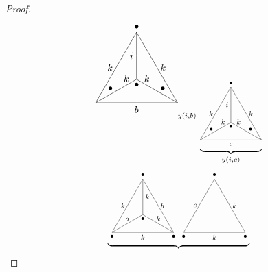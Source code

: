 \documentclass{amsart}
\begin{document}
\begin{proof}
\begin{equation}
{{{{\begin{tikzpicture}[scale=1.5]
\draw (0,0) 	-- (1,0) 		node [below] 	{$b$}; \draw (1,0) 		-- (2,0);
\draw (2,0) 	-- (1.5,.866) 	node [right] 	{$k$}; \draw (1.5,.866) 	-- (1,1.732);
\draw (1,1.732)	node [above] {$\bullet$} 	-- (.5,.866) 	node [left] 	{$k$}; \draw (.5,.866) 	-- (0,0);
\draw (0,0) 	-- (.75,.433) 	node [above] 	{$k$}; \draw (.75,.433) -- (1,0.577);
\draw (1,0.577) node [below] {$\bullet$} -- (1,1.1545) 	node [left]	{$i$}; \draw (1,1.1545) 	-- (1,1.732);
\draw (1,0.577) -- (1.25,.433) 	node [above] 	{$k$}; \draw (1.25,.433) -- (2,0);
\node at (.36,.35) {$\bullet$};
\node at (2-.36,.35) {$\bullet$};
\end{tikzpicture}}}}}_{y(i,b)}\,\underbrace{\vcenter{\hbox{\scalebox{.75}{\begin{tikzpicture}[scale=1.5]
\draw (0,0) -- (1,0) 		node [below] 	{$c$}; \draw (1,0) 		-- (2,0);
\draw (2,0) -- (1.5,.866) 	node [right] 	{$k$}; \draw (1.5,.866) 	-- (1,1.732);
\draw (1,1.732)	node [above] {$\bullet$} 	-- (.5,.866) 	node [left] 	{$k$}; \draw (.5,.866) 	-- (0,0);
\draw (0,0) 	-- (.75,.433) 	node [above] 	{$k$}; \draw (.75,.433) -- (1,0.577);
\draw (1,0.577) node [below] {$\bullet$} -- (1,1.1545) 	node [left]	{$i$}; \draw (1,1.1545) 	-- (1,1.732);
\draw (1,0.577) -- (1.25,.433) 	node [above] 	{$k$}; \draw (1.25,.433) -- (2,0);
\node at (.36,.35) {$\bullet$};
\node at (2-.36,.35) {$\bullet$};
\end{tikzpicture}}}}}_{y(i,c)}
\end{equation}
\begin{equation}\label{equ:II}
\underbrace{\vcenter{\hbox{\scalebox{.75}{\begin{tikzpicture}[scale=1.5]
\draw (0,0) node [below] {$\bullet$} -- (1,0) node [below] {$k$}; \draw (1,0) -- (2,0);
\draw (2,0) node [below] {$\bullet$} -- (1.5,.866) node [right] {$b$}; \draw (1.5,.866) -- (1,1.732);
\draw (1,1.732) node [above] {$\bullet$} -- (.5,.866) node [left] {$k$}; \draw (.5,.866) -- (0,0);
\draw (0,0) -- (.5,.2885) node [above] {$a$}; \draw (.5,.2885) -- (1,0.577);
\draw (1,0.577) node [below] {$\bullet$} -- (1,1.1545) node [right] {$k$}; \draw (1,1.1545) -- (1,1.732);
\draw (1,0.577) -- (1.5,.2885) node [above] {$k$}; \draw (1.5,.2885) -- (2,0);
\end{tikzpicture}}}}\,\vcenter{\hbox{\scalebox{.75}{\begin{tikzpicture}[scale=1.5]
\draw (0,0) node [below] {$\bullet$} -- (1,0) node [below] {$k$}; \draw (1,0) -- (2,0);
\draw (2,0) node [below] {$\bullet$} -- (1.5,.866) node [right] {$k$}; \draw (1.5,.866) -- (1,1.732);
\draw (1,1.732) node [above] {$\bullet$} -- (.5,.866) node [left] {$c$}; \draw (.5,.866) -- (0,0);

\end{tikzpicture}}}}}
\end{equation}
\end{proof}
\end{document}
